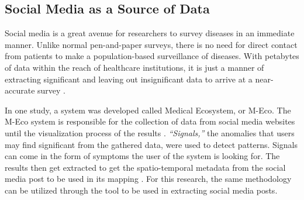


\subsection{Social Media as a Source of Data}
Social media is a great avenue for researchers to survey diseases in an immediate manner. Unlike normal pen-and-paper surveys, there is no need for direct contact from patients to make a population-based surveillance of diseases. With petabytes of data within the reach of healthcare institutions, it is just a manner of extracting significant and leaving out insignificant data to arrive at a near-accurate survey \cite{Denecke:2013aa}. 

In one study, a system was developed called Medical Ecosystem, or M-Eco. The M-Eco system is responsible for the collection of data from social media websites until the visualization process of the results \cite{Denecke:2013aa}. \textit{``Signals,''} the anomalies that users may find significant from the gathered data, were used to detect patterns. Signals can come in the form of symptoms the user of the system is looking for. The results then get extracted to get the spatio-temporal metadata from the social media post to be used in its mapping \cite{Denecke:2013aa}. For this research, the same methodology can be utilized through the tool to be used in extracting social media posts.

